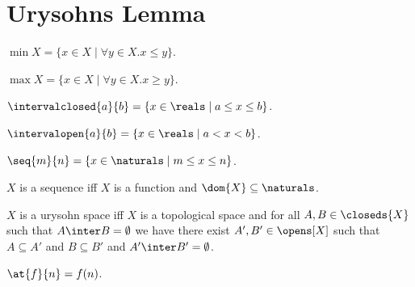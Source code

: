 














\section{Urysohns Lemma}

\begin{definition}\label{minimum}
    $\min{X} = \{x \in X \mid \forall y \in X. x \leq y \}$.
\end{definition}


\begin{definition}\label{maximum}
    $\max{X} = \{x \in X \mid \forall y \in X. x \geq y \}$.
\end{definition}


\begin{definition}\label{intervalclosed}
    $\intervalclosed{a}{b} = \{x \in \reals \mid a \leq x \leq b\}$.
\end{definition}


\begin{definition}\label{intervalopen}
    $\intervalopen{a}{b} = \{ x \in \reals \mid a < x < b\}$.
\end{definition}


\begin{definition}\label{one_to_n_set}
    $\seq{m}{n} = \{x \in \naturals \mid  m \leq x \leq n\}$.   
\end{definition}


\begin{definition}\label{sequence}
    $X$ is a sequence iff $X$ is a function and $\dom{X} \subseteq \naturals$.
\end{definition}


\begin{abbreviation}\label{urysohnspace}
    $X$ is a urysohn space iff
    $X$ is a topological space and
    for all $A,B \in \closeds{X}$ such that $A \inter B = \emptyset$
    we have there exist $A',B' \in \opens[X]$
    such that  $A \subseteq A'$ and $B \subseteq B'$ and $A' \inter B' = \emptyset$.    
\end{abbreviation}


\begin{abbreviation}\label{at}
    $\at{f}{n} = f(n)$.
\end{abbreviation}


